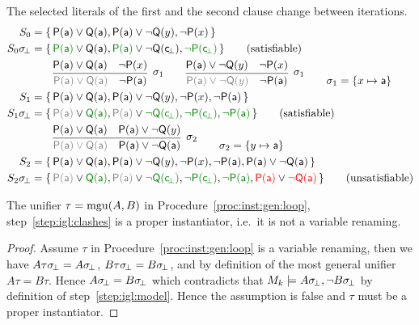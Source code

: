 \begin{example} The selected literals of the first and the second clause change between iterations.
\begin{align*}
S_0 &= \{ \,
	\mP(\ma)\lor\mQ(\ma),
	\mP(\ma)\lor\lnot\mQ(y),
	\lnot\mP(x)
 \, \}
\\
S_0\subsbot &= \{ \,
	{\colHi\mP(\ma)}\lor\mQ(\ma),
	{\colHi\mP(\ma)}\lor\lnot\mQ(\consbot),
	{\colHi\lnot\mP(\consbot)}
 \, \}
\tag{satisfiable}
\\
&\qquad\infer[
	\sigma_1
	]{
		{\colG \mP(\ma)\lor\mQ(\ma)}\quad\lnot\mP(\ma)
	}{
		\mP(\ma)\lor\mQ(\ma) & \lnot\mP(x)
	}
	\qquad\infer[
	\sigma_1
	]{
		{\colG \mP(\ma)\lor\lnot\mQ(y)}\quad\lnot\mP(\ma)
	}{
		\mP(\ma)\lor \lnot\mQ(y) & \lnot\mP(x)
	}
	\tag*{\( \sigma_1 = \{ x\mapsto\ma \} \)}
\\
S_1 &= \{ \,
	\mP(\ma)\lor\mQ(\ma),
	\mP(\ma)\lor\lnot\mQ(y),
	\lnot\mP(x),
	\lnot\mP(\ma)
 \, \}
\\
S_1\subsbot &= \{ \,
	{\colG\mP(\ma)}\lor{\colHi\mQ(\ma)},
	{\colG\mP(\ma)}\lor{\colHi\lnot\mQ(\consbot)},
	{\colHi\lnot\mP(\consbot)},
	{\colHi\lnot\mP(\ma)}
 \, \}
\tag{satisfiable}
\\
&\qquad\infer[
\sigma_2
]{
	{\colG \mP(\ma)\lor\mQ(\ma)}\quad\mP(\ma)\lor\lnot\mQ(\ma)
}{
	\mP(\ma)\lor\mQ(\ma) & \mP(\ma)\lor\lnot\mQ(y)
}
\tag*{\( \sigma_2 = \{ y\mapsto\ma \} \)}
\\
S_2 &= \{ \,
\mP(\ma)\lor\mQ(\ma),
\mP(\ma)\lor\lnot\mQ(y),
\lnot\mP(x),
\lnot\mP(\ma),
\mP(\ma)\lor\lnot\mQ(\ma)
 \, \}
\\
S_2\subsbot &= \{ \,
{\colG\mP(\ma)}\lor{\colHi\mQ(\ma)},
{\colG\mP(\ma)}\lor{\colHi\lnot\mQ(\consbot)},
{\colHi\lnot\mP(\consbot)},
{\colHi\lnot\mP(\ma)},
{\colLo\mP(\ma)}\lor{\colLo\lnot\mQ(\ma)}
 \, \}
\tag{unsatisfiable}
\end{align*}
\end{example}

\begin{lemma}
	The unifier \( \tau = \operatorname{mgu}(A,B) \) in Procedure~\ref{proc:inst:gen:loop},
	step~\ref{step:igl:clashes} is a proper instantiator,
	i.e.~it is not a variable renaming.
\end{lemma}
\begin{proof}
	Assume \( \tau \) in Procedure~\ref{proc:inst:gen:loop}
	is a variable renaming, then we have
	\( A\tau\sigma \!_\bot = A\sigma \!_\bot \),
	\( B\tau\sigma \!_\bot = B\sigma \!_\bot \),
	and by definition of the most general unifier \( A\tau = B\tau \).
	Hence \( A\sigma \!_\bot = B\sigma \!_\bot \) which contradicts that
	\( M_k\models A\sigma \!_\bot, \lnot B\sigma \!_\bot \)
	by definition of step~\ref{step:igl:model}.
	Hence the assumption is false and \( \tau \) must be a proper instantiator.
\end{proof}





